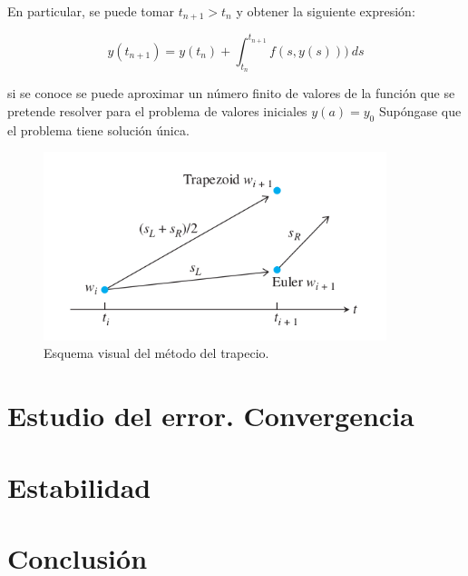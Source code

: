 \documentclass{article}
\theoremstyle{theorem-style}  %
\theoremstyle{definition}
\theoremstyle{example-style}
\begin{document}
	En particular, se puede tomar $t_{n+1} > t_n$ y obtener la siguiente expresión:
	
	$$ y(t_{n+1})  = y(t_n) + \int_{t_n}^{t_{n+1}} f(s,y(s))) \ ds $$
	
	si se conoce  se puede aproximar un número finito de valores de la función 
que se pretende resolver para el problema de valores iniciales $y(a) = y_0$
Supóngase que el problema tiene solución única.

	\begin{figure}[h]
		\centering
		\includegraphics[width=10cm]{./Images/trapecio-vs-euler.png}
		\caption{Esquema visual del método del trapecio.} 
		\label{fig:trapecio-vs-euler}
	\end{figure}



\section{Estudio del error. Convergencia}



\section{Estabilidad}


\section{Conclusión}



\printbibliography
\end{document}
